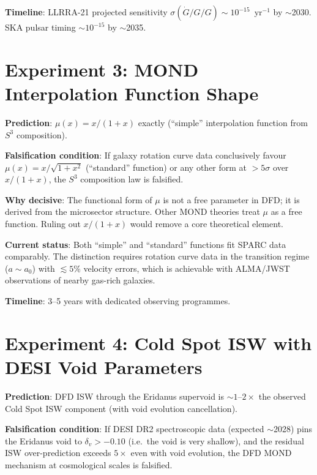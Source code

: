 \documentclass[11pt]{article}
\newcommand{\Gdot}{\dot{G}/G}
\newcommand{\aM}{a_0}
\newcommand{\mufd}{\mu}
\begin{document}
\textbf{Timeline}: LLRRA-21 projected sensitivity
$\sigma(\Gdot/G) \sim 10^{-15}$~yr$^{-1}$ by $\sim$2030. SKA
pulsar timing $\sim 10^{-15}$ by $\sim$2035.


\section{Experiment 3: MOND Interpolation Function Shape}
\label{sec:falsify-mu}

\textbf{Prediction}: $\mufd(x) = x/(1+x)$ exactly (``simple''
interpolation function from $S^3$ composition).

\textbf{Falsification condition}: If galaxy rotation curve data
conclusively favour $\mufd(x) = x/\sqrt{1+x^2}$ (``standard'' function)
or any other form at $>5\sigma$ over $x/(1+x)$, the $S^3$ composition
law is falsified.

\textbf{Why decisive}: The functional form of $\mufd$ is not a free
parameter in DFD; it is derived from the microsector structure. Other
MOND theories treat $\mufd$ as a free function. Ruling out $x/(1+x)$
would remove a core theoretical element.

\textbf{Current status}: Both ``simple'' and ``standard'' functions
fit SPARC data comparably. The distinction requires rotation curve
data in the transition regime ($a \sim \aM$) with $\lesssim 5\%$
velocity errors, which is achievable with ALMA/JWST observations of
nearby gas-rich galaxies.

\textbf{Timeline}: 3--5 years with dedicated observing programmes.


\section{Experiment 4: Cold Spot ISW with DESI Void Parameters}
\label{sec:falsify-T4}

\textbf{Prediction}: DFD ISW through the Eridanus supervoid is
$\sim 1$--$2\times$ the observed Cold Spot ISW component (with void
evolution cancellation).

\textbf{Falsification condition}: If DESI DR2 spectroscopic data
(expected $\sim$2028) pins the Eridanus void to $\delta_v > -0.10$
(i.e.\ the void is very shallow), and the residual ISW over-prediction
exceeds $5\times$ even with void evolution, the DFD MOND mechanism
at cosmological scales is falsified.
\end{document}
